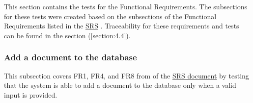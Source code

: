 \documentclass[12pt, titlepage]{article}
\begin{document}
This section contains the tests for the Functional Requirements. The subsections for these tests were created based on the subsections of the Functional Requirements listed in the \href{https://github.com/Inreet-Kaur/capstone/blob/main/docs/SRS/SRS.pdf}{SRS} \citep{SRS}. Traceability for these requirements and tests can be found in the section (\ref{section:4.4}).


\subsubsection{Add a document to the database} \label{section:4.1.1}

This subsection covers FR1, FR4, and FR8 from of the \href{https://github.com/Inreet-Kaur/capstone/blob/main/docs/SRS/SRS.pdf}{SRS document} \citep{SRS} by testing that the system is able to add a document to the database only when a valid input is provided.
\end{document}
